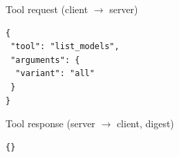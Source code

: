 \begin{mcpbox}{Tool request (client $\rightarrow$ server)}
\begin{lstlisting}[style=jsonstyle]
{
 "tool": "list_models",
 "arguments": {
  "variant": "all"
 }
}
\end{lstlisting}
\end{mcpbox}
\begin{mcpbox}{Tool response (server $\rightarrow$ client, digest)}
\begin{lstlisting}[style=jsonstyle]
{}
\end{lstlisting}
\end{mcpbox}